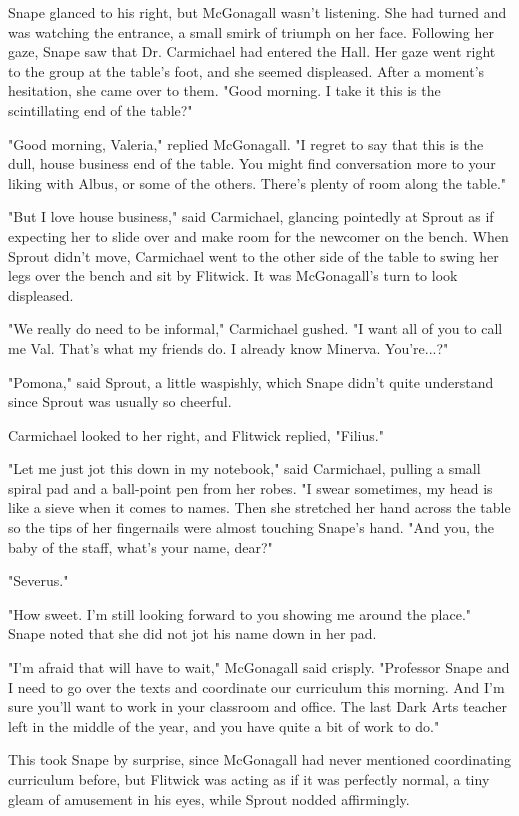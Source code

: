 \documentclass[a4paper,11pt]{article}
\begin{document}
Snape glanced to his right, but McGonagall wasn't listening. She had turned and was watching the entrance, a small smirk of triumph on her face. Following her gaze, Snape saw that Dr. Carmichael had entered the Hall. Her gaze went right to the group at the table's foot, and she seemed displeased. After a moment's hesitation, she came over to them. "Good morning. I take it this is the scintillating end of the table?"

"Good morning, Valeria," replied McGonagall. "I regret to say that this is the dull, house business end of the table. You might find conversation more to your liking with Albus, or some of the others. There's plenty of room along the table."

"But I love house business," said Carmichael, glancing pointedly at Sprout as if expecting her to slide over and make room for the newcomer on the bench. When Sprout didn't move, Carmichael went to the other side of the table to swing her legs over the bench and sit by Flitwick. It was McGonagall's turn to look displeased.

"We really do need to be informal," Carmichael gushed. "I want all of you to call me Val. That's what my friends do. I already know Minerva. You're...?"

"Pomona," said Sprout, a little waspishly, which Snape didn't quite understand since Sprout was usually so cheerful.

Carmichael looked to her right, and Flitwick replied, "Filius."

"Let me just jot this down in my notebook," said Carmichael, pulling a small spiral pad and a ball-point pen from her robes. "I swear sometimes, my head is like a sieve when it comes to names. Then she stretched her hand across the table so the tips of her fingernails were almost touching Snape's hand. "And you, the baby of the staff, what's your name, dear?"

"Severus."

"How sweet. I'm still looking forward to you showing me around the place." Snape noted that she did not jot his name down in her pad.

"I'm afraid that will have to wait," McGonagall said crisply. "Professor Snape and I need to go over the texts and coordinate our curriculum this morning. And I'm sure you'll want to work in your classroom and office. The last Dark Arts teacher left in the middle of the year, and you have quite a bit of work to do."

This took Snape by surprise, since McGonagall had never mentioned coordinating curriculum before, but Flitwick was acting as if it was perfectly normal, a tiny gleam of amusement in his eyes, while Sprout nodded affirmingly.
\end{document}
